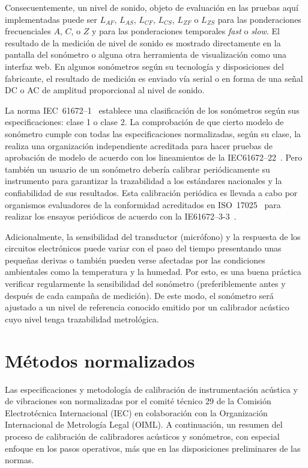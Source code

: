 Consecuentemente, un nivel de sonido, objeto de evaluación en las pruebas aquí implementadas puede ser $L_{AF}$, $L_{AS}$, $L_{CF}$, $L_{CS}$, $L_{ZF}$ o $L_{ZS}$ para las ponderaciones frecuenciales $A$, $C$, o $Z$ y para las ponderaciones temporales \emph{fast} o \emph{slow}.
El resultado de la medición de nivel de sonido es mostrado directamente en la pantalla del sonómetro o alguna otra herramienta de visualización como una interfaz web.
En algunos sonómetros según su tecnología y disposiciones del fabricante, el resultado de medición es enviado vía serial o en forma de una señal DC o AC de amplitud proporcional al nivel de sonido.

La norma \mbox{IEC 61672--1}~\citeyearpar{IEC_TC29_2013_1} establece una clasificación de los sonómetros según sus especificaciones: clase 1 o clase 2.
La comprobación de que cierto modelo de sonómetro cumple con todas las especificaciones normalizadas, según su clase, la realiza una organización independiente acreditada para hacer pruebas de aprobación de modelo de acuerdo con los lineamientos de la \mbox{IEC61672--22}~\citeyearpar{IEC_TC29_2013_2}.
Pero también un usuario de un sonómetro debería calibrar periódicamente su instrumento para garantizar la trazabilidad a los estándares nacionales y la confiabilidad de sus resultados.
Esta calibración periódica es llevada a cabo por organismos evaluadores de la conformidad acreditados en \mbox{ISO 17025}~\citeyearpar{ISO_CASCO_2017} para realizar los ensayos periódicos de acuerdo con la \mbox{IE61672--3-3}~\citeyearpar{IEC_TC29_2013_3}.

Adicionalmente, la sensibilidad del transductor (micrófono) y la respuesta de los circuitos electrónicos puede variar con el paso del tiempo presentando unas pequeñas derivas o también pueden verse afectadas por las condiciones ambientales como la temperatura y la humedad.
Por esto, es una buena práctica verificar regularmente la sensibilidad del sonómetro (preferiblemente antes y después de cada campaña de medición).
De este modo, el sonómetro será ajustado a un nivel de referencia conocido emitido por un calibrador acústico cuyo nivel tenga trazabilidad metrológica.


\section{Métodos normalizados}

Las especificaciones y metodología de calibración de instrumentación acústica y de vibraciones son normalizadas por el comité técnico 29 de la Comisión Electrotécnica Internacional (IEC) en colaboración con la Organización Internacional de Metrología Legal (OIML).
A continuación, un resumen del proceso de calibración de calibradores acústicos y sonómetros, con especial enfoque en los pasos operativos, más que en las disposiciones preliminares de las normas.

